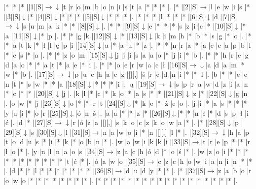 \documentclass[11pt]{article}
\newcommand\drarr{$\rightarrow \!\!\!\!\! \downarrow$}
\newcommand\rarr{$\rightarrow$}
\newcommand\darr{$\downarrow$}
\begin{document}
\noindent\begin{Puzzle}{17}{26}|*	|*	|*	|[1][S]\drarr	|t	|r	|o	|m	|b	|o	|n	|i	|s	|t	|a	|*	|*	|*	|.
|*	|[2][S]\rarr	|l	|e	|w	|i	|s	|*	|[3][S]\darr	|*	|[4][S]\darr	|*	|*	|*	|[5][S]\darr	|*	|*	|*	|.
|*	|*	|*	|l	|*	|*	|*	|[6][S]\darr	|d	|[7][S]\drarr	|s	|u	|m	|a	|k	|*	|*	|[8][S]\darr	|.
|*	|*	|[9][S]\darr	|e	|*	|*	|*	|s	|z	|i	|c	|*	|[10][S]\darr	|*	|a	|[11][S]\darr	|*	|p	|.
|*	|*	|g	|k	|[12][S]\darr	|*	|[13][S]\darr	|k	|i	|m	|h	|*	|b	|*	|s	|g	|*	|o	|.
|*	|*	|a	|t	|k	|*	|ł	|l	|ę	|p	|i	|[14][S]\darr	|a	|*	|a	|u	|*	|z	|.
|*	|*	|n	|r	|a	|*	|a	|e	|c	|a	|p	|b	|l	|*	|c	|s	|*	|a	|.
|*	|*	|z	|o	|m	|[15][S]\darr	|j	|j	|i	|s	|a	|a	|o	|*	|j	|i	|*	|b	|.
|*	|*	|h	|r	|e	|g	|d	|a	|o	|*	|*	|a	|t	|*	|a	|e	|*	|i	|.
|*	|*	|o	|e	|r	|w	|a	|c	|ł	|[16][S]\drarr	|a	|d	|a	|m	|*	|w	|*	|b	|.
|[17][S]\drarr	|p	|u	|c	|h	|a	|c	|z	|[][,]{ }	|ś	|r	|e	|d	|n	|i	|*	|*	|l	|.
|b	|*	|*	|e	|e	|n	|t	|*	|s	|w	|*	|*	|a	|[18][S]\darr	|*	|*	|*	|i	|.
|ą	|[19][S]\drarr	|s	|p	|r	|a	|w	|d	|z	|i	|a	|n	|*	|c	|*	|*	|[20][S]\darr	|j	|.
|k	|l	|*	|c	|*	|k	|o	|*	|a	|s	|*	|*	|[21][S]\darr	|z	|*	|[22][S]\darr	|g	|n	|.
|o	|w	|*	|j	|[23][S]\darr	|o	|*	|*	|r	|t	|[24][S]\darr	|*	|k	|e	|*	|ż	|e	|o	|.
|j	|i	|*	|a	|s	|*	|*	|*	|y	|u	|i	|*	|o	|r	|[25][S]\darr	|ó	|n	|ś	|.
|a	|a	|*	|*	|z	|*	|[26][S]\darr	|*	|*	|n	|ł	|*	|d	|s	|p	|ł	|i	|ć	|.
|d	|*	|[27][S]\drarr	|r	|ó	|ż	|a	|[][,]{ }	|s	|k	|o	|c	|z	|k	|o	|w	|a	|*	|.
|*	|[28][S]\darr	|p	|[29][S]\darr	|s	|[30][S]\darr	|l	|[31][S]\rarr	|n	|a	|w	|o	|i	|*	|n	|[][,]{ }	|l	|*	|.
|[32][S]\drarr	|h	|a	|p	|t	|o	|d	|u	|s	|*	|i	|*	|k	|*	|o	|b	|n	|*	|.
|w	|a	|w	|i	|k	|k	|i	|[33][S]\rarr	|t	|r	|e	|p	|*	|*	|r	|ł	|o	|*	|.
|y	|n	|ł	|n	|a	|o	|s	|[34][S]\rarr	|z	|a	|c	|h	|ó	|d	|*	|o	|ś	|*	|.
|w	|z	|o	|i	|*	|*	|*	|*	|*	|*	|*	|*	|*	|*	|*	|t	|ć	|*	|.
|ó	|a	|w	|o	|[35][S]\rarr	|c	|z	|c	|h	|o	|w	|i	|a	|n	|i	|n	|*	|*	|.
|d	|*	|*	|l	|*	|*	|*	|*	|*	|*	|*	|[36][S]\rarr	|d	|u	|d	|y	|*	|*	|.
|*	|[37][S]\rarr	|z	|a	|b	|o	|r	|o	|w	|o	|*	|*	|*	|*	|*	|*	|*	|*	|.
|*	|*	|*	|*	|*	|*	|*	|*	|*	|*	|*	|*	|*	|*	|*	|*	|*	|*	|.\end{Puzzle}

\newpage
\end{document}
